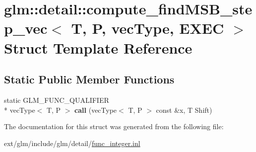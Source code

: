 \hypertarget{structglm_1_1detail_1_1compute__find_m_s_b__step__vec}{\section{glm\-:\-:detail\-:\-:compute\-\_\-find\-M\-S\-B\-\_\-step\-\_\-vec$<$ T, P, vec\-Type, E\-X\-E\-C $>$ Struct Template Reference}
\label{structglm_1_1detail_1_1compute__find_m_s_b__step__vec}
}
\subsection*{Static Public Member Functions}
\begin{DoxyCompactItemize}
\item 
\hypertarget{structglm_1_1detail_1_1compute__find_m_s_b__step__vec_af4ab89696a02cfcbc5d96dff9e92521c}{static G\-L\-M\-\_\-\-F\-U\-N\-C\-\_\-\-Q\-U\-A\-L\-I\-F\-I\-E\-R \\*
vec\-Type$<$ T, P $>$ {\bfseries call} (vec\-Type$<$ T, P $>$ const \&x, T Shift)}\label{structglm_1_1detail_1_1compute__find_m_s_b__step__vec_af4ab89696a02cfcbc5d96dff9e92521c}

\end{DoxyCompactItemize}


The documentation for this struct was generated from the following file\-:\begin{DoxyCompactItemize}
\item 
ext/glm/include/glm/detail/\hyperlink{func__integer_8inl}{func\-\_\-integer.\-inl}\end{DoxyCompactItemize}
